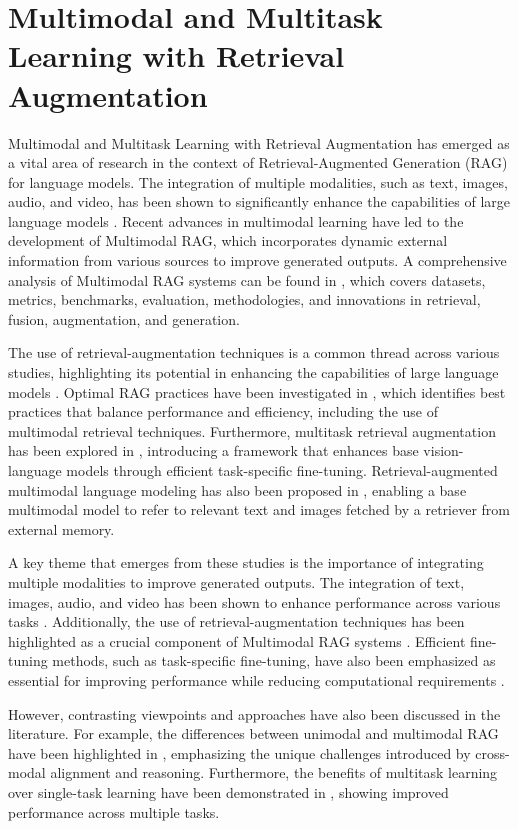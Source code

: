 \documentclass[conference]{IEEEtran}
\begin{document}
\section{Multimodal and Multitask Learning with Retrieval Augmentation}
Multimodal and Multitask Learning with Retrieval Augmentation has emerged as a vital area of research in the context of Retrieval-Augmented Generation (RAG) for language models. The integration of multiple modalities, such as text, images, audio, and video, has been shown to significantly enhance the capabilities of large language models \cite{b1}. Recent advances in multimodal learning have led to the development of Multimodal RAG, which incorporates dynamic external information from various sources to improve generated outputs. A comprehensive analysis of Multimodal RAG systems can be found in \cite{b2}, which covers datasets, metrics, benchmarks, evaluation, methodologies, and innovations in retrieval, fusion, augmentation, and generation.

The use of retrieval-augmentation techniques is a common thread across various studies, highlighting its potential in enhancing the capabilities of large language models \cite{b3}. Optimal RAG practices have been investigated in \cite{b4}, which identifies best practices that balance performance and efficiency, including the use of multimodal retrieval techniques. Furthermore, multitask retrieval augmentation has been explored in \cite{b5}, introducing a framework that enhances base vision-language models through efficient task-specific fine-tuning. Retrieval-augmented multimodal language modeling has also been proposed in \cite{b6}, enabling a base multimodal model to refer to relevant text and images fetched by a retriever from external memory.

A key theme that emerges from these studies is the importance of integrating multiple modalities to improve generated outputs. The integration of text, images, audio, and video has been shown to enhance performance across various tasks \cite{b1}. Additionally, the use of retrieval-augmentation techniques has been highlighted as a crucial component of Multimodal RAG systems \cite{b3}. Efficient fine-tuning methods, such as task-specific fine-tuning, have also been emphasized as essential for improving performance while reducing computational requirements \cite{b5}.

However, contrasting viewpoints and approaches have also been discussed in the literature. For example, the differences between unimodal and multimodal RAG have been highlighted in \cite{b2}, emphasizing the unique challenges introduced by cross-modal alignment and reasoning. Furthermore, the benefits of multitask learning over single-task learning have been demonstrated in \cite{b5}, showing improved performance across multiple tasks.
\end{document}
